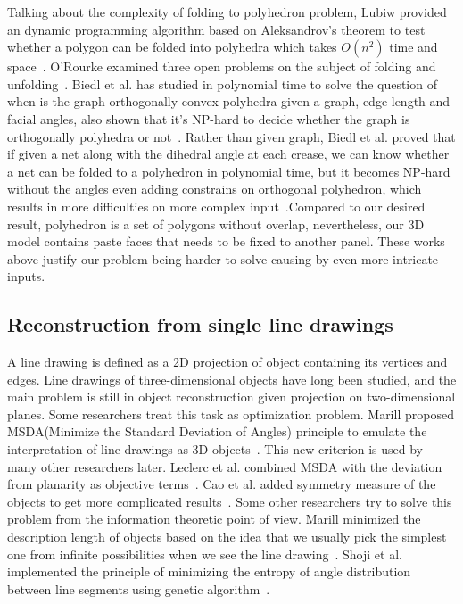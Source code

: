 Talking about the complexity of folding to polyhedron problem, Lubiw provided an dynamic programming algorithm based on Aleksandrov's theorem to test whether a polygon can be folded into polyhedra which takes $O(n^2)$ time and space~\cite{Lubiw1996When}. O'Rourke examined three open problems on the subject of folding and unfolding~\cite{O'Rourke:1998:FUC:646319.686376}. Biedl et al. has studied in polynomial time to solve the question of when is the graph orthogonally convex polyhedra given a graph, edge length and facial angles, also shown that it's NP-hard to decide whether the graph is orthogonally polyhedra or not~\cite{Biedl2004When}. Rather than given graph, Biedl et al.  proved that if given a net along with the dihedral angle at each crease, we can know whether a net can be folded to a polyhedron in polynomial time, but it becomes NP-hard without the angles even adding constrains on orthogonal polyhedron, which results in more difficulties on more complex input~\cite{Biedl:2005:NFP:1090462.1646553}.Compared to our desired result, polyhedron is a set of polygons without overlap, nevertheless, our 3D model contains paste faces that needs to be fixed to another panel. These works above justify our problem being harder to solve causing by even more intricate inputs.

\subsection{Reconstruction from single line drawings} 
A line drawing is defined as a 2D projection of object containing its vertices and edges. Line drawings of three-dimensional objects have long been studied, and the main problem is still in object reconstruction given projection on two-dimensional planes. Some researchers treat this task as optimization problem. Marill proposed MSDA(Minimize the Standard Deviation of Angles) principle to emulate the interpretation of line drawings as 3D objects~\cite{Marill:1991:EHI:113057.113061}. This new criterion is used by many other researchers later. Leclerc et al. combined MSDA with the deviation from planarity as objective terms~\cite{Leclerc1992An}. Cao et al. added symmetry measure of the objects to get more complicated results~\cite{Cao:2005:ORS:1097114.1097658}. Some other researchers try to solve this problem from the information theoretic point of view. Marill minimized the description length of objects based on the idea that we usually pick the simplest one from infinite possibilities when we see the line drawing~\cite{Marill1992Why}. Shoji et al. implemented the principle of minimizing the entropy of angle distribution between line segments using genetic algorithm~\cite{Shoji20013}. 

